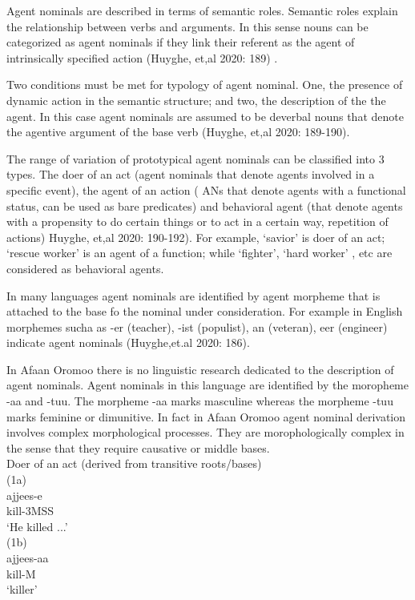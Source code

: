 \documentclass[11pt,a4paper]{article}
\begin{document}
Agent nominals are described in terms of  semantic roles. Semantic roles explain the relationship between verbs and arguments. In this sense nouns can be categorized as agent nominals if they link their referent as the agent of intrinsically specified action (Huyghe, et,al 2020: 189) . 

Two conditions must be met for typology of agent nominal. One, the presence of dynamic action in the semantic structure; and two, the description of the the agent. In this case agent nominals are assumed to be deverbal nouns that denote the agentive argument of the base verb (Huyghe, et,al 2020: 189-190).

The range of variation of prototypical agent nominals can be classified into 3 types. The doer of an act (agent nominals that denote agents involved in a specific event), the agent of an action ( ANs that denote agents with a functional status, can be used as bare predicates) and behavioral agent (that denote agents with a propensity to do certain things or to act in a certain way, repetition of actions) Huyghe, et,al 2020: 190-192). For example, ‘savior’  is doer of an act; ‘rescue worker’ is an agent of a function; while ‘fighter’, ‘hard worker’ , etc are considered as behavioral agents.

In many languages agent nominals are identified by agent morpheme that is attached to the base fo the nominal under consideration. For example in English morphemes sucha as -er (teacher), -ist (populist), an (veteran), eer (engineer) indicate agent nominals (Huyghe,et.al 2020: 186).

In Afaan Oromoo there is no linguistic research dedicated to the description of agent nominals. Agent nominals in this language are identified by the moropheme -aa and -tuu. The morpheme -aa marks masculine whereas the morpheme -tuu marks feminine or dimunitive. In fact in Afaan Oromoo agent nominal derivation involves complex morphological processes. They are morophologically complex in the sense that they require causative or middle bases. \\

Doer of an act (derived from transitive roots/bases)\\

(1a)\\
\indent	 ajjees-e\\
\indent kill-3MSS\\
\indent	‘He killed ...'\\

(1b) \\
\indent	ajjees-aa\\
\indent kill-M\\
\indent ‘killer’\\
\end{document}
